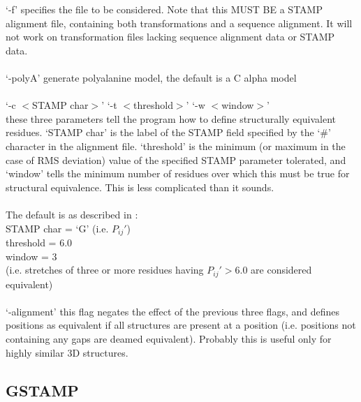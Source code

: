 `-f' specifies the file to be considered.  Note that this MUST BE 
  a STAMP alignment file, containing both transformations and a
  sequence alignment.  It will not work on transformation files
  lacking sequence alignment data or STAMP data.\\
\\
`-polyA' generate  polyalanine model, the default is a C alpha
   model\\
\\
`-c $<$STAMP char$>$' `-t $<$threshold$>$' `-w $<$window$>$'\\
  these three parameters tell the program how to define structurally
  equivalent residues.  `STAMP char' is the label of the STAMP field
  specified by the `\#' character  in the alignment file.
  `threshold' is the minimum (or maximum in the case of RMS deviation)
  value of the specified STAMP parameter tolerated, and `window' tells
  the minimum number of residues over which this must be true for 
  structural equivalence.  This is less complicated than it sounds.\\
\\
  The default is as described in \cite{rb92b}:\\  
   STAMP char = `G' (i.e. $P_{ij}{\prime}$)\\
   threshold  = 6.0\\
   window     = 3 \\
   (i.e. stretches of three or more residues having $P_{ij}{\prime} > 6.0$
     are considered equivalent)\\
\\
`-alignment' this flag negates the effect of the previous three flags, and
  defines positions as equivalent if all structures are present at a position
  (i.e. positions not containing any gaps are deamed equivalent). Probably
  this is useful only for highly similar 3D structures.

\subsection{GSTAMP}


